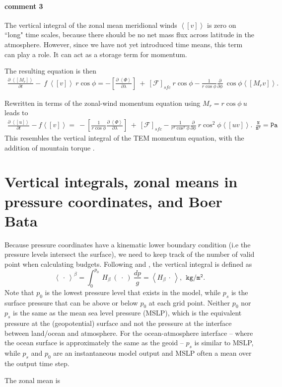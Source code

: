\documentclass[11pt]{article}
\numberwithin{equation}{section}
\newcommand{\beq}{\begin{equation}}
\newcommand{\eeq}{\end{equation}}
\newcommand{\la}{\langle}
\newcommand{\ra}{\rangle}
\newcommand{\lara}[1]{\left\la{#1}\right\ra}
\newcommand{\cphi}{\cos \phi}
\begin{document}
\paragraph{comment 3}
The vertical integral of the zonal mean meridional winds $\lara{[v]}$ is zero on ``long" time scales, because there should be no net mass flux across latitude in the atmosphere. However, since we have not yet introduced time means, this term can play a role. It can act as a storage term for momentum.\par

\newpage
The resulting equation is then 
\begin{align*}
\frac{\partial ~\lara{[M_r]}}{\partial t}  -~ f~  \lara{ [v]}  ~r \cphi = - \left[ \frac{\partial~\lara{\Phi}}{\partial \lambda}  \right] ~+ ~ [\mathcal{F}]_{sfc} ~ r \cphi  - \frac{1}{r \cos{\phi}}  \frac{\partial}{\partial \phi}  ~\cos{\phi} \lara{ [M_r v] }. 
\end{align*}

Rewritten in terms of the zonal-wind momentum equation using $M_r = r \cphi ~u$ leads to
\begin{align} \label{eq:balance}
\frac{\partial ~\lara{[u]}}{\partial t}  - f \lara{ [v]}    = ~ - \left[\frac{1}{r \cphi} \frac{\partial~\lara{\Phi}}{\partial \lambda}  \right]    ~+~ [\mathcal{F}]_{sfc}  - \frac{1}{r^2 \cos^2{\phi}}  \frac{\partial}{\partial \phi}  ~ r \cos^2{\phi} \lara{ [u v] }.  ~~\mathtt{\frac{N}{m^2}=Pa}
\end{align}
This resembles the vertical integral of the TEM momentum equation, with the addition of mountain torque \citep{Andrews1976,Edmon1980}.



\section{Vertical integrals, zonal means in pressure coordinates, and Boer Bata}
Because pressure coordinates have a kinematic lower boundary condition (i.e the pressure levels intersect the surface), we need to keep track of the number of valid point when calculating budgets. Following \citet{Boer1982} and \citet{Wills2015}, the vertical integral is defined as
\beq \label{beta_int}
\lara {~\cdot~}^\beta = \int_0^{p_0} ~H_\beta~(~\cdot~) ~ \frac{d p}{g} = \lara{H_\beta~\cdot~}, ~~\mathtt{kg /m^2}.  
\eeq
Note that $p_0$ is the lowest pressure level that exists in the model, while $p_s$ is the surface pressure that can be above or below $p_0$ at each grid point. Neither $p_0$ nor $p_s$ is the same as the mean sea level pressure (MSLP), which is the equivalent pressure at the (geopotential) surface and not the pressure at the interface between land/ocean and atmosphere. For the ocean-atmosphere interface -- where the ocean surface is approximately the same as the geoid -- $p_s$ is similar to MSLP, while $p_s$ and $p_0$ are an instantaneous model output and MSLP often a mean over the output time step.\par
The zonal mean is
\end{document}
